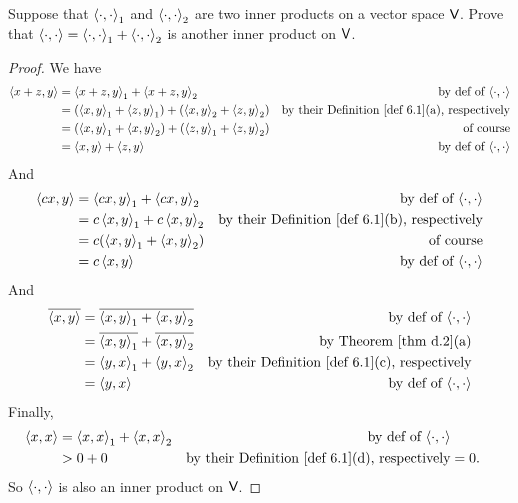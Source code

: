 \begin{exercise} \label{exercise 6.1.13}
Suppose that \(\left< \cdot, \cdot \right>_1\) and \(\left< \cdot, \cdot \right>_2\) are two inner products on a vector space \(\textsf{V}\).
Prove that \(\left< \cdot, \cdot \right> = \left< \cdot, \cdot \right>_1 + \left< \cdot, \cdot \right>_2\) is another inner product on \(\textsf{V}\).
\end{exercise}

\begin{proof}
We have
\begin{align*}
    \LG x + z, y \RG & = \LG x + z, y \RG_1 + \LG x + z, y \RG_2 & \text{by def of \(\InnerOp\)} \\
        & = (\LG x, y \RG_1 + \LG z, y \RG_1) + (\LG x, y \RG_2 + \LG z, y \RG_2) & \text{by their \DEF{6.1}(a), respectively} \\
        & = (\LG x, y \RG_1 + \LG x, y \RG_2) + (\LG z, y \RG_1 + \LG z, y \RG_2) & \text{of course} \\
        & = \LG x, y \RG + \LG z, y \RG & \text{by def of \(\InnerOp\)}
\end{align*}
And
\begin{align*}
    \LG cx, y \RG & = \LG cx, y \RG_1 + \LG cx, y \RG_2 & \text{by def of \(\InnerOp\)} \\
        & = c\LG x, y \RG_1 + c\LG x, y \RG_2 & \text{by their \DEF{6.1}(b), respectively} \\
        & = c(\LG x, y \RG_1 + \LG x, y \RG_2) & \text{of course} \\
        & = c\LG x, y \RG & \text{by def of \(\InnerOp\)}
\end{align*}
And
\begin{align*}
    \conjugatet{\LG x, y \RG} & = \conjugatet{\LG x, y \RG_1 + \LG x, y \RG_2} & \text{by def of \(\InnerOp\)} \\
        & = \conjugatet{\LG x, y \RG_1} + \conjugatet{\LG x, y \RG_2} & \text{by \THM{d.2}(a)} \\
        & = \LG y, x \RG_1 + \LG y, x \RG_2 & \text{by their \DEF{6.1}(c), respectively} \\
        & = \LG y, x \RG & \text{by def of \(\InnerOp\)}
\end{align*}
Finally,
\begin{align*}
    \LG x, x \RG & = \LG x, x \RG_1 + \LG x, x \RG_2 & \text{by def of \(\InnerOp\)} \\
        & > 0 + 0 & \text{by their \DEF{6.1}(d), respectively}
        & = 0.
\end{align*}
So \(\left< \cdot, \cdot \right>\) is also an inner product on \(\textsf{V}\).
\end{proof}

